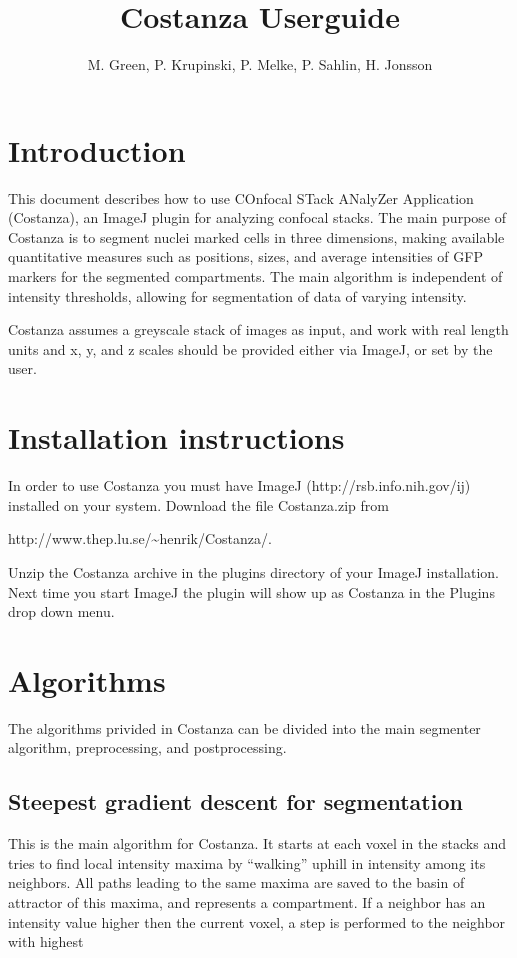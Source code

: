 \documentclass[a4paper,12pt]{article}
\title{Costanza Userguide}
\author{M. Green, P. Krupinski, P. Melke, P. Sahlin, H. Jonsson}
\begin{document}
\maketitle


\section{Introduction}

This document describes how to use COnfocal STack ANalyZer Application
(Costanza), an ImageJ\cite{Abramoff2004} plugin for analyzing confocal
stacks. The main purpose of Costanza is to segment nuclei marked cells
in three dimensions, making available quantitative measures such as
positions, sizes, and average intensities of GFP markers for the
segmented compartments. The main algorithm is independent of intensity
thresholds, allowing for segmentation of data of varying intensity.

Costanza assumes a greyscale stack of images as input, and work with
real length units and x, y, and z scales should be provided either via
ImageJ, or set by the user.

\section{Installation instructions}

In order to use Costanza you must have ImageJ
(http://rsb.info.nih.gov/ij) installed on your system. Download the
file Costanza.zip from

http://www.thep.lu.se/\~{}henrik/Costanza/. 

Unzip the Costanza archive in the plugins directory of your ImageJ
installation. Next time you start ImageJ the plugin will show up as Costanza
in the Plugins drop down menu.

\section{Algorithms}

The algorithms privided in Costanza can be divided into the main
segmenter algorithm, preprocessing, and postprocessing.

\subsection{Steepest gradient descent for segmentation}

This is the main algorithm for Costanza. It starts at each voxel in the stacks
and tries to find local intensity maxima by ``walking'' uphill in intensity
among its neighbors. All paths leading to the same maxima are saved to the
basin of attractor of this maxima, and represents a compartment. If a neighbor
has an intensity value higher then the current voxel, a step is performed to
the neighbor with highest
\end{document}
